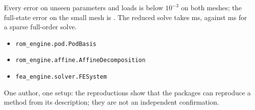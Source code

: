 \newpage\thispagestyle{hl}
\par
{}
\begin{hlheadline}Every error on unseen parameters and loads is below $10^{-3}$ on both meshes; the full-state error on the small mesh is \cplSAGlob. The reduced solve takes \cplSTRom{} ms, against \cplSTFomsparse{} ms for a sparse full-order solve.\end{hlheadline}
{\begin{itemize}\setlength\itemsep{2pt}
\item \texttt{rom\_engine.pod.PodBasis}
\item \texttt{rom\_engine.affine.AffineDecomposition}
\item \texttt{fea\_engine.solver.FESystem}
\end{itemize}}
\begin{hllimit}One author, one setup: the reproductions show that the packages can reproduce a method from its description; they are not an independent confirmation.\end{hllimit}
